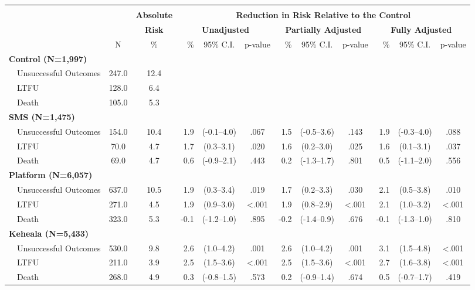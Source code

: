 \scriptsize{\def\sym#1{\ifmmode^{#1}\else\(^{#1}\)\fi}
\begin{tabular}{p{.05in}lcc|rcc|rcc|rcc}
\hline\hline \\[-8pt]
\rowcolor{yellow!15}	& 		& & \textbf{Absolute} 		& \multicolumn{9}{c}{\textbf{Reduction in Risk Relative to the Control}} \\
\rowcolor{yellow!15}	&		& & \textbf{Risk}		& \multicolumn{3}{c|}{\textbf{Unadjusted}}  & \multicolumn{3}{c|}{\textbf{Partially Adjusted}}	& \multicolumn{3}{c}{\textbf{Fully Adjusted}}  \\
\rowcolor{yellow!15} & &  N & \% & \% & 95\% C.I. & p-value & \% & 95\% C.I. & p-value & \% & 95\% C.I. & p-value \\ \hline
\multicolumn{4}{l|}{\textbf{Control (N=1,997)}}  					& &  &					& &	&				& & & 		\\
& Unsuccessful Outcomes & 247.0 & 12.4 & & & & & & & & &  \\
& LTFU & 128.0 & 6.4 & & & & & & & & &  \\
& Death & 105.0 & 5.3 & & & & & & & & &  \\
[1em]
\multicolumn{4}{l|}{\textbf{SMS (N=1,475)}}  					& &  &					& &	&				& & & 		\\
& Unsuccessful Outcomes & 154.0 & 10.4 & 1.9 & (-0.1--4.0) & .067& 1.5 & (-0.5--3.6) & .143& 1.9 & (-0.3--4.0) & .088 \\
& LTFU & 70.0 & 4.7 & 1.7 & (0.3--3.1) & .020& 1.6 & (0.2--3.0) & .025& 1.6 & (0.1--3.1) & .037 \\
& Death & 69.0 & 4.7 & 0.6 & (-0.9--2.1) & .443& 0.2 & (-1.3--1.7) & .801& 0.5 & (-1.1--2.0) & .556 \\
[1em]
\multicolumn{4}{l|}{\textbf{Platform (N=6,057)}}  					& &  &					& &	&				& & & 		\\
& Unsuccessful Outcomes & 637.0 & 10.5 & 1.9 & (0.3--3.4) & .019& 1.7 & (0.2--3.3) & .030& 2.1 & (0.5--3.8) & .010 \\
& LTFU & 271.0 & 4.5 & 1.9 & (0.9--3.0) & <.001& 1.9 & (0.8--2.9) & <.001& 2.1 & (1.0--3.2) & <.001 \\
& Death & 323.0 & 5.3 & -0.1 & (-1.2--1.0) & .895& -0.2 & (-1.4--0.9) & .676& -0.1 & (-1.3--1.0) & .810 \\
[1em]
\multicolumn{4}{l|}{\textbf{Keheala (N=5,433)}}  					& &  &					& &	&				& & & 		\\
& Unsuccessful Outcomes & 530.0 & 9.8 & 2.6 & (1.0--4.2) & .001& 2.6 & (1.0--4.2) & .001& 3.1 & (1.5--4.8) & <.001 \\
& LTFU & 211.0 & 3.9 & 2.5 & (1.5--3.6) & <.001& 2.5 & (1.5--3.6) & <.001& 2.7 & (1.6--3.8) & <.001 \\
& Death & 268.0 & 4.9 & 0.3 & (-0.8--1.5) & .573& 0.2 & (-0.9--1.4) & .674& 0.5 & (-0.7--1.7) & .419 \\
\hline \hline
\end{tabular}}